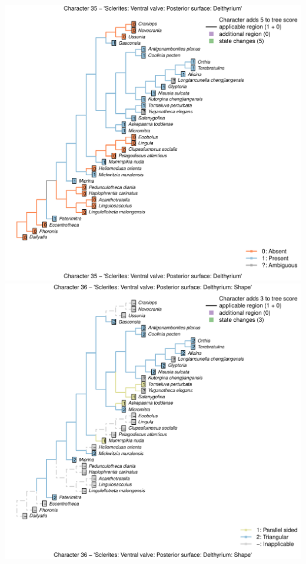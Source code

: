 \documentclass[]{book}
\theoremstyle{definition}
\theoremstyle{definition}
\theoremstyle{definition}
\theoremstyle{remark}
\begin{document}
\includegraphics{Brachiopod_phylogeny_files/figure-latex/unnamed-chunk-4-35.pdf}
\includegraphics{Brachiopod_phylogeny_files/figure-latex/unnamed-chunk-4-36.pdf}
\end{document}

